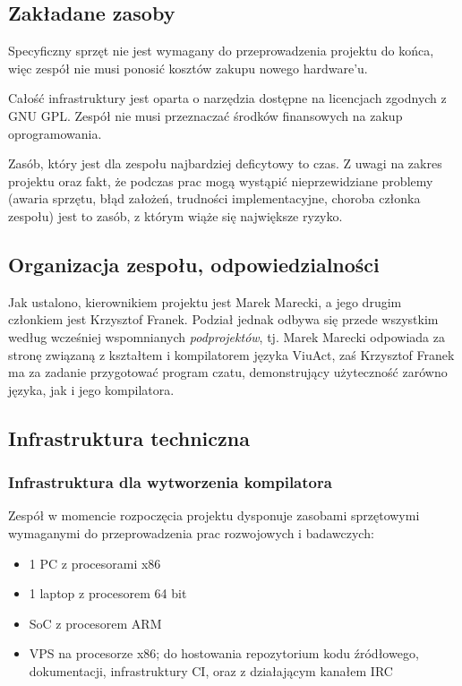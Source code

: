 \documentclass[11pt,oneside,a4paper,titlepage,onecolumn]{article}
\begin{document}
\subsection{Zakładane zasoby}

Specyficzny sprzęt nie jest wymagany do przeprowadzenia projektu do końca, więc zespół nie musi ponosić
kosztów zakupu nowego hardware'u.

Całość infrastruktury jest oparta o narzędzia dostępne na licencjach zgodnych z GNU GPL. Zespół nie musi
przeznaczać środków finansowych na zakup oprogramowania.

Zasób, który jest dla zespołu najbardziej deficytowy to czas. Z uwagi
na zakres projektu oraz fakt, że podczas prac mogą wystąpić nieprzewidziane problemy (awaria sprzętu, błąd
założeń, trudności implementacyjne, choroba członka zespołu) jest to zasób, z którym wiąże się największe
ryzyko.

\subsection{Organizacja zespołu, odpowiedzialności}

Jak ustalono, kierownikiem projektu jest Marek Marecki, a jego drugim członkiem jest Krzysztof Franek.
Podział jednak odbywa się przede wszystkim według wcześniej wspomnianych \textit{podprojektów}, tj. Marek
Marecki odpowiada za stronę związaną z kształtem i kompilatorem języka ViuAct, zaś Krzysztof Franek
ma za zadanie przygotować program czatu, demonstrujący użyteczność zarówno języka, jak i jego kompilatora.

\subsection{Infrastruktura techniczna}

\subsubsection{Infrastruktura dla wytworzenia kompilatora}
Zespół w momencie rozpoczęcia projektu dysponuje zasobami sprzętowymi wymaganymi do przeprowadzenia prac
rozwojowych i badawczych:

\begin{itemize}
    \item 1 PC z procesorami x86
    \item 1 laptop z procesorem 64 bit
    \item SoC z procesorem ARM
    \item VPS na procesorze x86; do hostowania repozytorium kodu źródłowego, dokumentacji, infrastruktury CI, oraz
        z działającym kanałem IRC
\end{itemize}
\end{document}
